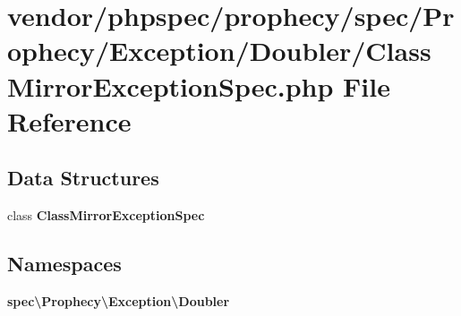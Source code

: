 \section{vendor/phpspec/prophecy/spec/\+Prophecy/\+Exception/\+Doubler/\+Class\+Mirror\+Exception\+Spec.php File Reference}
\label{_class_mirror_exception_spec_8php}
\subsection*{Data Structures}
\begin{DoxyCompactItemize}
\item 
class {\bf Class\+Mirror\+Exception\+Spec}
\end{DoxyCompactItemize}
\subsection*{Namespaces}
\begin{DoxyCompactItemize}
\item 
 {\bf spec\textbackslash{}\+Prophecy\textbackslash{}\+Exception\textbackslash{}\+Doubler}
\end{DoxyCompactItemize}
